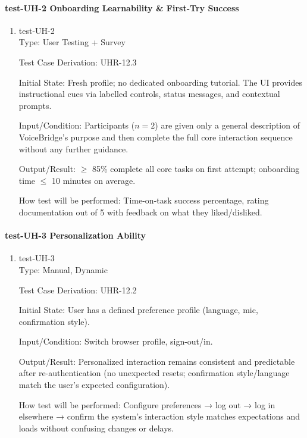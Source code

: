 \documentclass[12pt, titlepage]{article}
\begin{document}
\paragraph{test-UH-2 Onboarding Learnability \& First-Try Success}

\begin{enumerate}
\item{test-UH-2\\}
Type: User Testing + Survey

Test Case Derivation: UHR-12.3

Initial State: Fresh profile; no dedicated onboarding tutorial. The UI provides instructional cues via labelled controls, status messages, and contextual prompts.

Input/Condition: Participants ($n=2$) are given only a general description of VoiceBridge's purpose and then complete the full core interaction sequence without any further guidance.

Output/Result: $\geq$ 85\% complete all core tasks on first attempt; onboarding time $\leq$ 10 minutes on average.

How test will be performed: Time-on-task success percentage, rating documentation out of 5 with feedback on what they liked/disliked.
\end{enumerate}

\paragraph{test-UH-3 Personalization Ability}

\begin{enumerate}
\item{test-UH-3\\}
Type: Manual, Dynamic

Test Case Derivation: UHR-12.2

Initial State: User has a defined preference profile (language, mic, confirmation style).

Input/Condition: Switch browser profile, sign-out/in.

Output/Result: Personalized interaction remains consistent and predictable after re-authentication (no unexpected resets; confirmation style/language match the user’s expected configuration).

How test will be performed: Configure preferences → log out → log in elsewhere → confirm the system’s interaction style matches expectations and loads without confusing changes or delays.
\end{enumerate}
\end{document}
